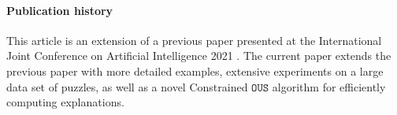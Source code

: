 \documentclass[a4paper,UKenglish,cleveref, autoref, thm-restate, pdfa]{lipics-v2021}
\renewcommand\comment[1]{}
\newcommand{\emilio}[1]{{\comment{\color{red}Emilio: #1}}}
\newcommand{\bart}[1]{{\comment{\color{OliveGreen}Bart: #1}}}
\newcommand\mm[1]{\ensuremath{#1}\xspace}
\newcommand\call[1]{\mm{\texttt{#1}}}
\newcommand\omus{\mm{\call{OUS}}}
\begin{document}
\paragraph*{Publication history} This article is an extension of a previous paper presented at the International Joint Conference on Artificial Intelligence 2021 \cite{ijcai2021}. The current paper extends the previous paper with more detailed examples, extensive experiments on a large data set of puzzles, as well as a novel Constrained \omus algorithm for efficiently computing explanations.

%
%
%
\end{document}
